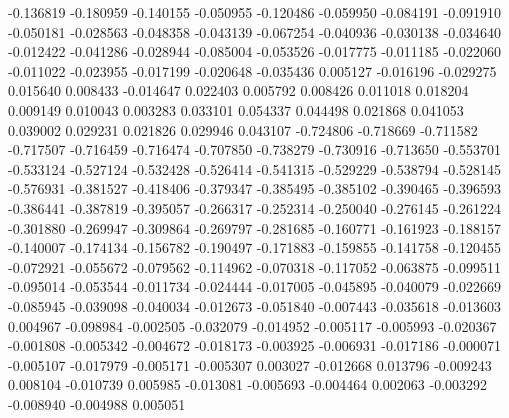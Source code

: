 -0.136819
-0.180959
-0.140155
-0.050955
-0.120486
-0.059950
-0.084191
-0.091910
-0.050181
-0.028563
-0.048358
-0.043139
-0.067254
-0.040936
-0.030138
-0.034640
-0.012422
-0.041286
-0.028944
-0.085004
-0.053526
-0.017775
-0.011185
-0.022060
-0.011022
-0.023955
-0.017199
-0.020648
-0.035436
0.005127
-0.016196
-0.029275
0.015640
0.008433
-0.014647
0.022403
0.005792
0.008426
0.011018
0.018204
0.009149
0.010043
0.003283
0.033101
0.054337
0.044498
0.021868
0.041053
0.039002
0.029231
0.021826
0.029946
0.043107
-0.724806
-0.718669
-0.711582
-0.717507
-0.716459
-0.716474
-0.707850
-0.738279
-0.730916
-0.713650
-0.553701
-0.533124
-0.527124
-0.532428
-0.526414
-0.541315
-0.529229
-0.538794
-0.528145
-0.576931
-0.381527
-0.418406
-0.379347
-0.385495
-0.385102
-0.390465
-0.396593
-0.386441
-0.387819
-0.395057
-0.266317
-0.252314
-0.250040
-0.276145
-0.261224
-0.301880
-0.269947
-0.309864
-0.269797
-0.281685
-0.160771
-0.161923
-0.188157
-0.140007
-0.174134
-0.156782
-0.190497
-0.171883
-0.159855
-0.141758
-0.120455
-0.072921
-0.055672
-0.079562
-0.114962
-0.070318
-0.117052
-0.063875
-0.099511
-0.095014
-0.053544
-0.011734
-0.024444
-0.017005
-0.045895
-0.040079
-0.022669
-0.085945
-0.039098
-0.040034
-0.012673
-0.051840
-0.007443
-0.035618
-0.013603
0.004967
-0.098984
-0.002505
-0.032079
-0.014952
-0.005117
-0.005993
-0.020367
-0.001808
-0.005342
-0.004672
-0.018173
-0.003925
-0.006931
-0.017186
-0.000071
-0.005107
-0.017979
-0.005171
-0.005307
0.003027
-0.012668
0.013796
-0.009243
0.008104
-0.010739
0.005985
-0.013081
-0.005693
-0.004464
0.002063
-0.003292
-0.008940
-0.004988
0.005051
